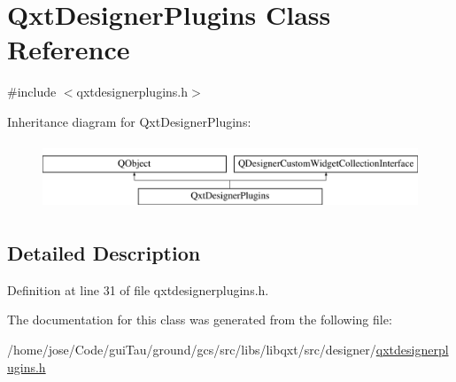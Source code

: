 \hypertarget{class_qxt_designer_plugins}{\section{Qxt\-Designer\-Plugins Class Reference}
\label{class_qxt_designer_plugins}
}


{\ttfamily \#include $<$qxtdesignerplugins.\-h$>$}

Inheritance diagram for Qxt\-Designer\-Plugins\-:\begin{figure}[H]
\begin{center}
\leavevmode
\includegraphics[height=2.000000cm]{class_qxt_designer_plugins}
\end{center}
\end{figure}


\subsection{Detailed Description}


Definition at line 31 of file qxtdesignerplugins.\-h.



The documentation for this class was generated from the following file\-:\begin{DoxyCompactItemize}
\item 
/home/jose/\-Code/gui\-Tau/ground/gcs/src/libs/libqxt/src/designer/\hyperlink{qxtdesignerplugins_8h}{qxtdesignerplugins.\-h}\end{DoxyCompactItemize}
